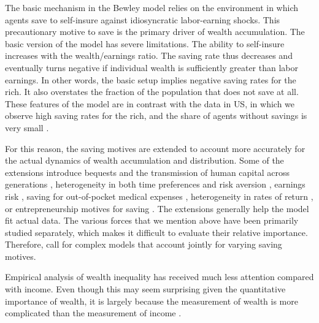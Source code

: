 \begin{refsection}
The basic mechanism in the Bewley model relies on the environment in which agents save to self-insure against idiosyncratic labor-earning shocks. This precautionary motive to save is the primary driver of wealth accumulation. The basic version of the model has severe limitations. The ability to self-insure increases with the wealth/earnings ratio. The saving rate thus decreases and eventually turns negative if individual wealth is sufficiently greater than labor earnings. In other words, the basic setup implies negative saving rates for the rich. It also overstates the fraction of the population that does not save at all. These features of the model are in contrast with the data in \ac{US}, in which we observe high saving rates for the rich, and the share of agents without savings is very small \parencite{DENARDI2017280}. 

For this reason, the saving motives are extended to account more accurately for the actual dynamics of wealth accumulation and distribution. Some of the extensions introduce bequests and the transmission of human capital across generations \parencite{nardi2004wealth,de2014bequests}, heterogeneity in both time preferences and risk aversion \parencite{HENDRICKS2007}, earnings risk \parencite{castaneda2003}, saving for out-of-pocket medical expenses \parencite{kopecky2014impact}, heterogeneity in rates of return \parencite{lusardi2017optimal,BENHABIB2015489}, or entrepreneurship motives for saving \parencite{cagetti2006entrepreneurship}. The extensions generally help the model fit actual data. The various forces that we mention above have been primarily studied separately, which makes it difficult to evaluate their relative importance. Therefore, \textcite{DENARDI2017280} call for complex models that account jointly for varying saving motives.

Empirical analysis of wealth inequality has received much less attention compared with income. Even though this may seem surprising given the quantitative importance of wealth, it is largely because the measurement of wealth is more complicated than the measurement of income \parencite{zucman2019}.


\end{refsection}
